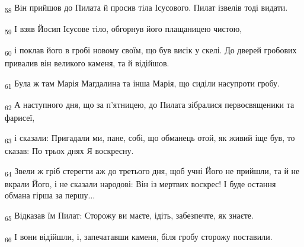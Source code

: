 \begin{tcolorbox}
\textsubscript{58} Він прийшов до Пилата й просив тіла Ісусового. Пилат ізвелів тоді видати.
\end{tcolorbox}
\begin{tcolorbox}
\textsubscript{59} І взяв Йосип Ісусове тіло, обгорнув його плащаницею чистою,
\end{tcolorbox}
\begin{tcolorbox}
\textsubscript{60} і поклав його в гробі новому своїм, що був висік у скелі. До дверей гробових привалив він великого каменя, та й відійшов.
\end{tcolorbox}
\begin{tcolorbox}
\textsubscript{61} Була ж там Марія Магдалина та інша Марія, що сиділи насупроти гробу.
\end{tcolorbox}
\begin{tcolorbox}
\textsubscript{62} А наступного дня, що за п'ятницею, до Пилата зібралися первосвященики та фарисеї,
\end{tcolorbox}
\begin{tcolorbox}
\textsubscript{63} і сказали: Пригадали ми, пане, собі, що обманець отой, як живий іще був, то сказав: По трьох днях Я воскресну.
\end{tcolorbox}
\begin{tcolorbox}
\textsubscript{64} Звели ж гріб стерегти аж до третього дня, щоб учні Його не прийшли, та й не вкрали Його, і не сказали народові: Він із мертвих воскрес! І буде остання обмана гірша за першу...
\end{tcolorbox}
\begin{tcolorbox}
\textsubscript{65} Відказав їм Пилат: Сторожу ви маєте, ідіть, забезпечте, як знаєте.
\end{tcolorbox}
\begin{tcolorbox}
\textsubscript{66} І вони відійшли, і, запечатавши каменя, біля гробу сторожу поставили.
\end{tcolorbox}
